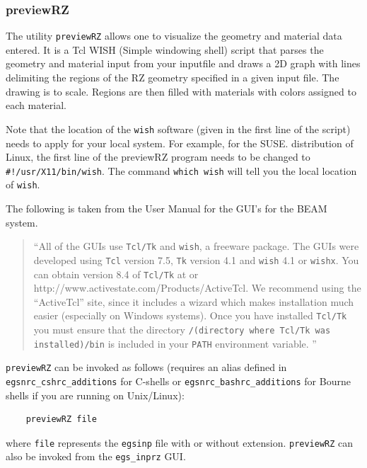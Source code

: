 \documentclass[12pt,twoside]{article}  %
\begin{document}
\subsubsection{previewRZ}

 

The utility \verb+previewRZ+ allows one to visualize the geometry and material
data entered. It is a Tcl WISH (Simple windowing shell)
script that parses the geometry and material input from your inputfile and
draws a 2D graph with lines delimiting the regions of the RZ geometry
specified in a given input file.
The drawing is to scale. Regions are then filled with materials with
colors assigned to each material.

Note that the location of the \verb+wish+ software (given in the first line
of the script) needs to apply
for your local system. For example, for the SUSE. distribution of
Linux, the first line of the previewRZ program needs to be changed to
\verb+#!/usr/X11/bin/wish+. The command {\tt which wish} will tell you
the local location of {\tt wish}.

The following is taken from the User Manual for the GUI's for the BEAM
system\cite{Tr04}.
\begin{quote}
``All of the GUIs use {\tt Tcl/Tk} and {\tt wish}, a freeware package.
The GUIs were developed using {\tt Tcl} version 7.5, {\tt Tk} version
4.1 and {\tt wish} 4.1 or {\tt wishx}.  You
can obtain version 8.4 of {\tt Tcl/Tk} at
 or \\
{http://www.activestate.com/Products/ActiveTcl}.  We recommend using
the ``ActiveTcl'' site, since it includes a wizard
which makes installation much easier (especially on Windows systems).
Once you have installed {\tt Tcl/Tk} you must ensure that the directory
{\tt /(directory where Tcl/Tk was installed)/bin} is included in your
{\tt PATH} environment variable. ''
\end{quote}
\verb+previewRZ+ can be invoked as follows (requires an alias defined in
\verb+egsnrc_cshrc_additions+ for C-shells or
\verb+egsnrc_bashrc_additions+ for Bourne shells if you are running
on Unix/Linux):
\begin{verbatim}
    previewRZ file
\end{verbatim}
where \verb+file+ represents the \verb+egsinp+ file with or without
extension.  \verb+previewRZ+ can also be invoked from the
{\tt egs\_inprz} GUI\cite{Ma03}.
\end{document}
